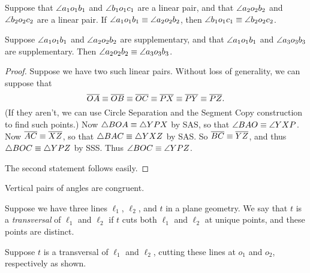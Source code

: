 \begin{prop} \mbox{}
\begin{proplist}
\item Suppose that \(\angle{a_1o_1b_1}\) and \(\angle{b_1o_1c_1}\) are a linear pair, and that \(\angle{a_2o_2b_2}\) and \(\angle{b_2o_2c_2}\) are a linear pair.
If \(\angle{a_1o_1b_1} \equiv \angle{a_2o_2b_2}\), then \(\angle{b_1o_1c_1} \equiv \angle{b_2o_2c_2}\).
\item Suppose \(\angle{a_1o_1b_1}\) and \(\angle{a_2o_2b_2}\) are supplementary, and that \(\angle{a_1o_1b_1}\) and \(\angle{a_3o_3b_3}\) are supplementary.
Then \(\angle{a_2o_2b_2} \equiv \angle{a_3o_3b_3}\).
\end{proplist}
\end{prop}

\begin{proof}
Suppose we have two such linear pairs.
Without loss of generality, we can suppose that \[ \overline{OA} \equiv \overline{OB} \equiv \overline{OC} \equiv \overline{PX} \equiv \overline{PY} \equiv \overline{PZ}. \] (If they aren't, we can use Circle Separation and the Segment Copy construction to find such points.) Now \(\bigtriangleup{BOA} \equiv \bigtriangleup{YPX}\) by SAS, so that \(\angle{BAO} \equiv \angle{YXP}\).
Now \(\overline{AC} \equiv \overline{XZ}\), so that \(\bigtriangleup{BAC} \equiv \bigtriangleup{YXZ}\) by SAS.
So \(\overline{BC} \equiv \overline{YZ}\), and thus \(\bigtriangleup{BOC} \equiv \bigtriangleup{YPZ}\) by SSS.
Thus \(\angle{BOC} \equiv \angle{YPZ}\).

The second statement follows easily.
\end{proof}

\begin{cor}
Vertical pairs of angles are congruent.
\end{cor}


\begin{dfn}[Transversal]
Suppose we have three lines \(\ell_1\), \(\ell_2\), and \(t\) in a plane geometry.
We say that \(t\) is a \emph{transversal} of \(\ell_1\) and \(\ell_2\) if \(t\) cuts both \(\ell_1\) and \(\ell_2\) at unique points, and these points are distinct.
\end{dfn}

Suppose \(t\) is a transversal of \(\ell_1\) and \(\ell_2\), cutting these lines at \(o_1\) and \(o_2\), respectively as shown.

